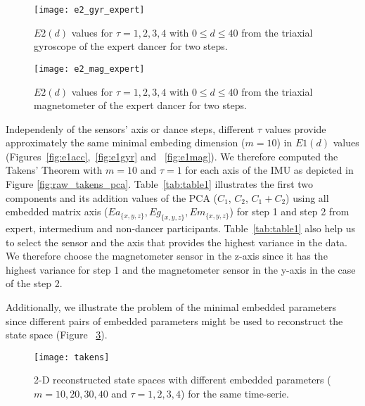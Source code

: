 \documentclass{sigchi}
\begin{document}
      \begin{figure}[htbp!] 
  \centering    
  \texttt{[image: e2\_gyr\_expert]}
  \caption[PA]{$E2(d)$ values for $\tau=1,2,3,4$ with $0 \leq d \leq40 $
  from the triaxial gyroscope of the expert dancer for two steps.
  }
  \label{fig:e2gyr}
  \end{figure}
      \begin{figure}[htbp!] 
  \centering    
  \texttt{[image: e2\_mag\_expert]}
  \caption[PA]{$E2(d)$ values for $\tau=1,2,3,4$ with $0 \leq d \leq40 $
  from the triaxial magnetometer of the expert dancer for two steps.
  }
  \label{fig:e2mag}
  \end{figure}  

Independenly of the sensors' axis or dance steps, different $\tau$ values provide approximately the 
same minimal embeding dimension ($m=10$) in $E1(d)$ values (Figures~\ref{fig:e1acc},~\ref{fig:e1gyr} and ~\ref{fig:e1mag}).
We therefore computed the Takens' Theorem 
with $m=10$ and $\tau = 1$ for each axis of the IMU as depicted in Figure \ref{fig:raw_takens_pca}.
Table~\ref{tab:table1} illustrates the first two components and its addition values of the PCA ($C_1$, $C_2$, $C_1+ C_2$)
using all embedded matrix axis ($Ea_{ \{ x,y,z \} },Eg_{\{ x,y,z \}},Em_{\{ x,y,z \}}$) for step 1 and step 2 from expert, 
intermedium and non-dancer participants.
Table~\ref{tab:table1} also help us to select the sensor and the axis that 
provides the highest variance in the data.
We therefore choose the magnetometer sensor in the z-axis since it has the highest variance for step 1
and the magnetometer sensor in the y-axis in the case of the step 2.

Additionally, we illustrate the problem of the minimal embedded parameters since 
different pairs of embedded parameters might be used to reconstruct the state space (Figure ~\ref{fig:takens_problem}). 
\begin{figure}[htbp!] 
\centering    
\texttt{[image: takens]}
\caption[PA]{2-D reconstructed state spaces with different embedded parameters ($m=10,20,30,40$ and $\tau= 1,2,3,4$)
for the same time-serie.}
\label{fig:takens_problem}
\end{figure}
\end{document}
